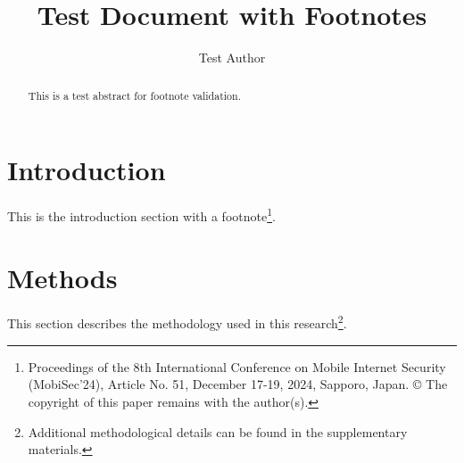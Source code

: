 \documentclass{easychair}
\title{Test Document with Footnotes}
\author{Test Author}
\begin{document}
\maketitle

\begin{abstract}
This is a test abstract for footnote validation.
\end{abstract}


\section{Introduction}
This is the introduction section with a footnote\footnote{Proceedings of the 8th International Conference on Mobile Internet Security (MobiSec'24), Article No. 51, December 17-19, 2024, Sapporo, Japan. © The copyright of this paper remains with the author(s).}.

\section{Methods}
This section describes the methodology used in this research\footnote{Additional methodological details can be found in the supplementary materials.}.
\end{document}
